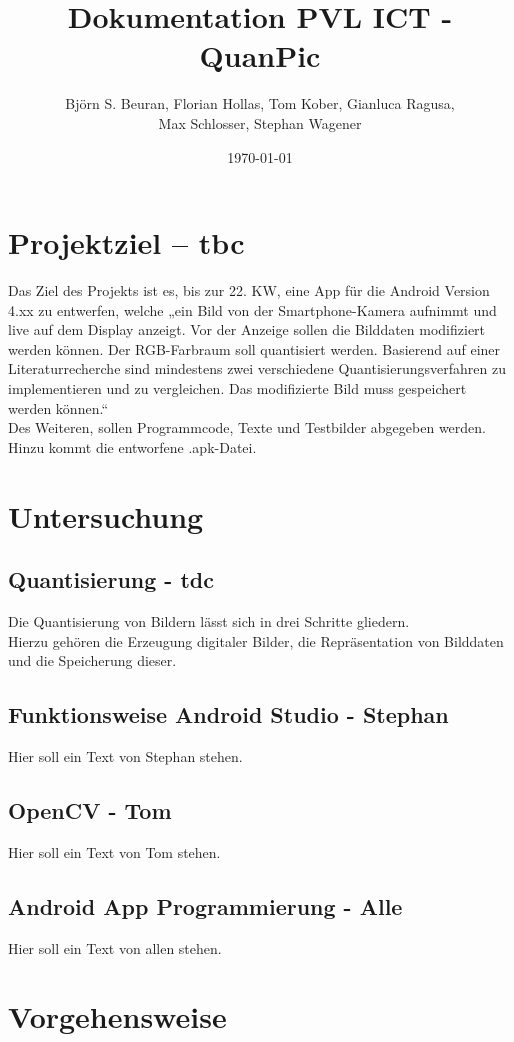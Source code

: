 \documentclass[11pt]{scrartcl}
\title{Dokumentation PVL ICT - QuanPic}
\author{Björn S. Beuran, Florian Hollas, Tom Kober, Gianluca Ragusa,\\ Max Schlosser, Stephan Wagener}
\date{\today}
\begin{document}
\maketitle
\tableofcontents
\thispagestyle{plain}
\clearpage
 
 \section{Projektziel – tbc}
 Das Ziel des Projekts ist es, bis zur 22. KW, eine App für die Android Version 4.xx zu entwerfen,
 welche „ein Bild von der Smartphone-Kamera aufnimmt und live auf dem Display anzeigt. Vor der 
 Anzeige sollen die Bilddaten modifiziert werden können. Der RGB-Farbraum soll quantisiert werden. 
 Basierend auf einer Literaturrecherche sind mindestens zwei verschiedene Quantisierungsverfahren 
 zu implementieren und zu vergleichen. Das modifizierte Bild muss gespeichert werden können.“
 \\Des Weiteren, sollen Programmcode, Texte und Testbilder abgegeben werden. Hinzu kommt die 
 entworfene .apk-Datei.
 
 \section{Untersuchung}
 \subsection{Quantisierung - tdc}
 Die Quantisierung von Bildern lässt sich in drei Schritte gliedern.
 \\Hierzu gehören die Erzeugung digitaler Bilder, die Repräsentation von Bilddaten und die Speicherung 
 dieser.
 \subsection{Funktionsweise Android Studio - Stephan}
 Hier soll ein Text von Stephan stehen.
 \subsection{OpenCV - Tom}
 Hier soll ein Text von Tom stehen.
 \subsection{Android App Programmierung - Alle}
 Hier soll ein Text von allen stehen.
 \section{Vorgehensweise}
 
\end{document}
